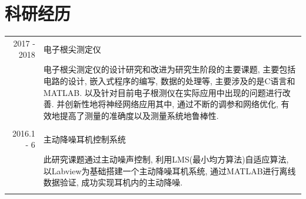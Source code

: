 \documentclass[a4paper,11pt]{article}
\begin{document}

\section{科研经历}
\begin{tabular}{r|p{11cm}}
 \textsc{2017 - 2018} & 电子根尖测定仪 \\&\footnotesize{电子根尖测定仪的设计研究和改进为研究生阶段的主要课题, 主要包括电路的设计, 嵌入式程序的编写, 数据的处理等, 主要涉及的是C语言和MATLAB. 以及针对目前电子根测仪在实际应用中出现的问题进行改善. 并创新性地将神经网络应用其中, 通过不断的调参和网络优化, 有效地提高了测量的准确度以及测量系统地鲁棒性.}\\\multicolumn{2}{c}{} \\
 \textsc{2016.1 - 6} & 主动降噪耳机控制系统 \\&\footnotesize{此研究课题通过主动噪声控制, 利用LMS(最小均方算法)自适应算法, 以Labview为基础搭建一个主动降噪耳机系统, 通过MATLAB进行离线数据验证, 成功实现耳机内的主动降噪.}\\\multicolumn{2}{c}{} \\
\end{tabular}

\end{document}
